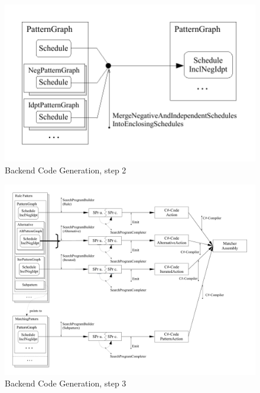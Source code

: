\begin{figure}[htbp]
  \centering
  \includegraphics[width=\textwidth]{fig/AblaufCodeerzeugungBackend2}
  \caption{Backend Code Generation, step 2}
  \label{figbackendcodegen2}
\end{figure}

\begin{figure}[htbp]
  \centering
  \includegraphics[width=\textwidth]{fig/AblaufCodeerzeugungBackend3}
  \caption{Backend Code Generation, step 3}
  \label{figbackendcodegen3}
\end{figure}


